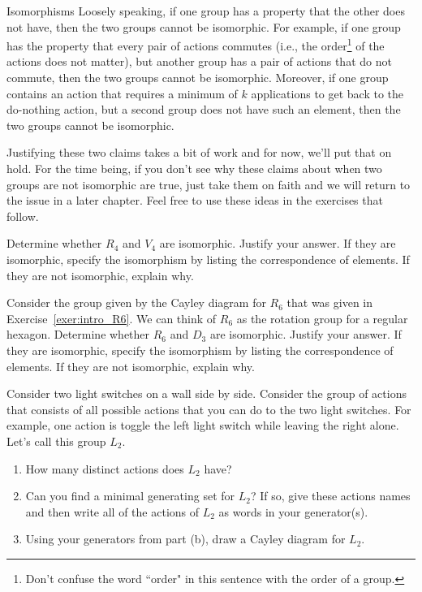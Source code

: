 \begin{section}{Isomorphisms}
Loosely speaking, if one group has a property that the other does not have, then the two groups cannot be isomorphic.  For example, if one group has the property that every pair of actions commutes (i.e., the order\footnote{Don't confuse the word ``order" in this sentence with the order of a group.} of the actions does not matter), but another group has a pair of actions that do not commute, then the two groups cannot be isomorphic.  Moreover, if one group contains an action that requires a minimum of $k$ applications to get back to the do-nothing action, but a second group does not have such an element, then the two groups cannot be isomorphic.  

Justifying these two claims takes a bit of work and for now, we'll put that on hold.  For the time being, if you don't see why these claims about when two groups are not isomorphic are true, just take them on faith and we will return to the issue in a later chapter.  Feel free to use these ideas in the exercises that follow.

\begin{problem}\label{exer:R4vsV4}
Determine whether $R_4$ and $V_4$ are isomorphic.  Justify your answer.  If they are isomorphic, specify the isomorphism by listing the correspondence of elements.  If they are not isomorphic, explain why.
\end{problem}

\begin{problem}\label{prob:R6_not_iso_D3}
Consider the group given by the Cayley diagram for $R_6$ that was given in Exercise~\ref{exer:intro_R6}.  We can think of $R_6$ as the rotation group for a regular hexagon.  Determine whether $R_6$ and $D_3$ are isomorphic.  Justify your answer.  If they are isomorphic, specify the isomorphism by listing the correspondence of elements.  If they are not isomorphic, explain why.
\end{problem}

\begin{exercise}
Consider two light switches on a wall side by side.  Consider the group of actions that consists of all possible actions that you can do to the two light switches.  For example, one action is toggle the left light switch while leaving the right alone.  Let's call this group $L_2$.
\begin{enumerate}[label=\rm{(\alph*)}]
\item How many distinct actions does $L_2$ have?
\item Can you find a minimal generating set for $L_2$?  If so, give these actions names and then write all of the actions of $L_2$ as words in your generator(s).
\item Using your generators from part (b), draw a Cayley diagram for $L_2$.
\end{enumerate}
\end{exercise}


\end{section}
